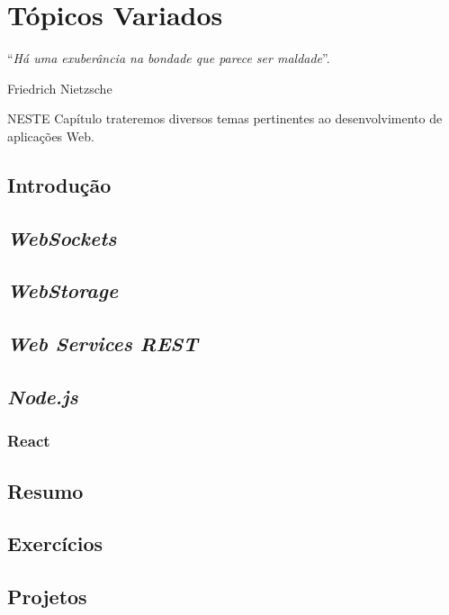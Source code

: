 \chapter{Tópicos Variados}\label{cap:topicosVariados}
\epigraph{``\textit{Há uma exuberância na bondade que parece ser maldade}''.}{Friedrich Nietzsche}

\lettrine[lines=4, lhang=0.1, lraise=0, loversize=0.2, findent=0.1em]{\textcolor{corAzulTema}{N}}{ESTE} Capítulo trateremos diversos temas pertinentes ao desenvolvimento de aplicações Web.

\section{Introdução}

\section{\textit{WebSockets}}

\section{\textit{WebStorage}}

\section{\textit{Web Services REST}}

\section{\textit{Node.js}}

\subsection{React}

\section{Resumo}

\section{Exercícios}

\section{Projetos}
